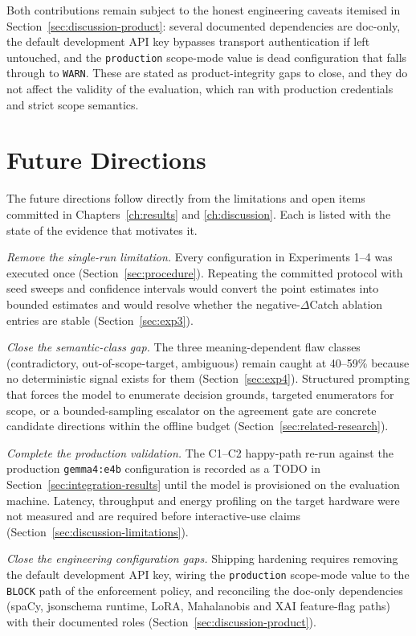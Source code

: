 Both contributions remain subject to the honest engineering caveats itemised in
Section~\ref{sec:discussion-product}: several documented dependencies are
doc-only, the default development API key bypasses transport authentication if
left untouched, and the \texttt{production} scope-mode value is dead
configuration that falls through to \texttt{WARN}. These are stated as
product-integrity gaps to close, and they do not affect the validity of the
evaluation, which ran with production credentials and strict scope semantics.

\section{Future Directions}\label{sec:future-directions}

The future directions follow directly from the limitations and open items
committed in Chapters~\ref{ch:results} and \ref{ch:discussion}. Each is listed
with the state of the evidence that motivates it.

\emph{Remove the single-run limitation.} Every configuration in
Experiments 1--4 was executed once (Section~\ref{sec:procedure}). Repeating the
committed protocol with seed sweeps and confidence intervals would convert the
point estimates into bounded estimates and would resolve whether the
negative-$\Delta$Catch ablation entries are stable (Section~\ref{sec:exp3}).

\emph{Close the semantic-class gap.} The three meaning-dependent flaw classes
(contradictory, out-of-scope-target, ambiguous) remain caught at 40--59\%
because no deterministic signal exists for them (Section~\ref{sec:exp4}).
Structured prompting that forces the model to enumerate decision grounds,
targeted enumerators for scope, or a bounded-sampling escalator on the
agreement gate are concrete candidate directions within the offline budget
(Section~\ref{sec:related-research}).

\emph{Complete the production validation.} The C1--C2 happy-path re-run against
the production \texttt{gemma4:e4b} configuration is recorded as a TODO in
Section~\ref{sec:integration-results} until the model is provisioned on the
evaluation machine. Latency, throughput and energy profiling on the target
hardware were not measured and are required before interactive-use claims
(Section~\ref{sec:discussion-limitations}).

\emph{Close the engineering configuration gaps.} Shipping hardening requires
removing the default development API key, wiring the \texttt{production}
scope-mode value to the \texttt{BLOCK} path of the enforcement policy, and
reconciling the doc-only dependencies (spaCy, jsonschema runtime, LoRA,
Mahalanobis and XAI feature-flag paths) with their documented roles
(Section~\ref{sec:discussion-product}).

